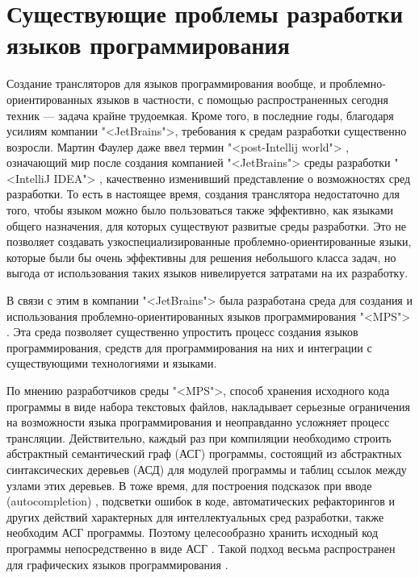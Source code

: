 \section{Существующие проблемы разработки языков программирования}
Создание трансляторов для языков программирования вообще, и проблемно-ориентированных языков в частности, с помощью распространенных сегодня техник \cite{redDragon,hanter} --- задача крайне трудоемкая. Кроме того, в последние годы, благодаря усилиям компании "<JetBrains">, требования к средам разработки существенно возросли. Мартин Фаулер даже ввел термин "<post-Intellij world"> \cite{fowler01}, означающий мир после создания компанией "<JetBrains"> среды разработки "<IntelliJ IDEA"> \cite{intellijIDEA}, качественно изменивший представление о возможностях сред разработки. То есть в настоящее время, создания транслятора недостаточно для того, чтобы языком можно было пользоваться также эффективно, как языками общего назначения, для которых существуют развитые среды разработки. Это не позволяет создавать узкоспециализированные проблемно-ориентированные языки, которые были бы очень эффективны для решения небольшого класса задач, но выгода от использования таких языков нивелируется затратами на их разработку.

В связи с этим в компании "<JetBrains"> была разработана среда для создания и использования проблемно-ориентированных языков программирования "<MPS"> \cite{dmitriev,fowler02}. Эта среда позволяет существенно упростить процесс создания языков программирования, средств для программирования на них и интеграции с существующими технологиями и языками.

По мнению разработчиков среды "<MPS">, способ хранения исходного кода программы в виде набора текстовых файлов, накладывает серьезные ограничения на возможности языка программирования и неоправданно усложняет процесс трансляции. Действительно, каждый раз при компиляции необходимо строить абстрактный семантический граф (АСГ) \cite{portableSourceCode} программы, состоящий из абстрактных синтаксических деревьев (АСД) \cite{plopAST} для модулей программы и таблиц ссылок между узлами этих деревьев. В тоже время, для построения подсказок при вводе (autocompletion) \cite{myAutocompletion}, подсветки ошибок в коде, автоматических рефакторингов \cite{fowler03} и других действий характерных для  интеллектуальных сред разработки, также необходим АСГ программы. Поэтому целесообразно хранить исходный код программы непосредственно в виде АСГ \cite{simonyi}. Такой подход весьма распространен для графических языков программирования \cite{myUMLSwitchEclipse,gmf,msdsl}.

